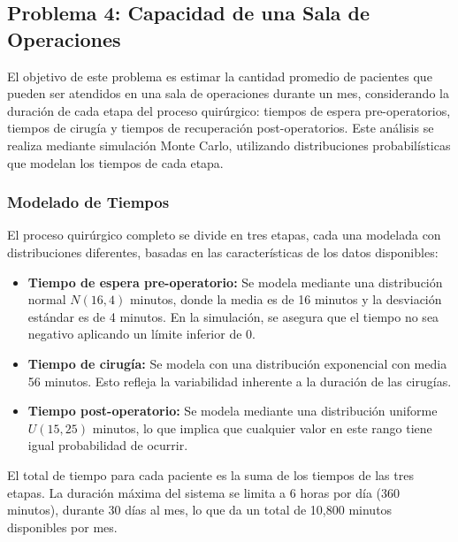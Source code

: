 \documentclass[12pt]{article}
\begin{document}
\subsection{Problema 4: Capacidad de una Sala de Operaciones}
El objetivo de este problema es estimar la cantidad promedio de pacientes que pueden ser atendidos en una sala de operaciones durante un mes, considerando la duración de cada etapa del proceso quirúrgico: tiempos de espera pre-operatorios, tiempos de cirugía y tiempos de recuperación post-operatorios. Este análisis se realiza mediante simulación Monte Carlo, utilizando distribuciones probabilísticas que modelan los tiempos de cada etapa.

\subsubsection{Modelado de Tiempos}
El proceso quirúrgico completo se divide en tres etapas, cada una modelada con distribuciones diferentes, basadas en las características de los datos disponibles:
\begin{itemize}
    \item \textbf{Tiempo de espera pre-operatorio:} Se modela mediante una distribución normal $N(16, 4)$ minutos, donde la media es de 16 minutos y la desviación estándar es de 4 minutos. En la simulación, se asegura que el tiempo no sea negativo aplicando un límite inferior de 0.
    \item \textbf{Tiempo de cirugía:} Se modela con una distribución exponencial con media 56 minutos. Esto refleja la variabilidad inherente a la duración de las cirugías.
    \item \textbf{Tiempo post-operatorio:} Se modela mediante una distribución uniforme $U(15, 25)$ minutos, lo que implica que cualquier valor en este rango tiene igual probabilidad de ocurrir.
\end{itemize}

El total de tiempo para cada paciente es la suma de los tiempos de las tres etapas. La duración máxima del sistema se limita a 6 horas por día (360 minutos), durante 30 días al mes, lo que da un total de 10,800 minutos disponibles por mes.
\end{document}
